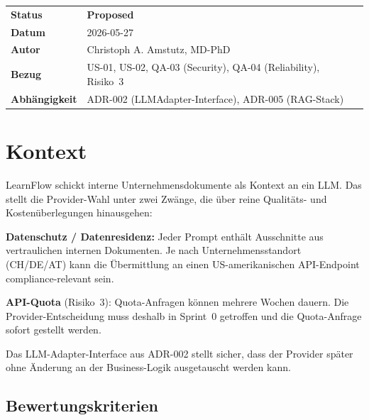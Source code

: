 \documentclass[a4paper, 11pt, oneside]{report}
\newcommand{\statusProposed}{%
  \colorbox{statusproposed!28}{\small\bfseries\color{statusproposed!70!black}\;Proposed\;}}
\begin{document}
\begin{tcolorbox}[enhanced, colback=adrlightblue, colframe=adrblue,
  boxrule=0.9pt, arc=3pt, left=8pt, right=8pt, top=6pt, bottom=6pt]
\begin{tabular}{@{}L{3.2cm}L{11.5cm}@{}}
\textbf{Status}      & \statusProposed \\[3pt]
\textbf{Datum}       & 2026-05-27 \\[3pt]
\textbf{Autor}       & Christoph A. Amstutz, MD-PhD \\[3pt]
\textbf{Bezug}       & US-01, US-02, QA-03 (Security), QA-04 (Reliability), Risiko~3 \\[3pt]
\textbf{Abhängigkeit}& ADR-002 (LLMAdapter-Interface), ADR-005 (RAG-Stack) \\
\end{tabular}
\end{tcolorbox}

\section{Kontext}

LearnFlow schickt interne Unternehmensdokumente als Kontext an ein LLM.
Das stellt die Provider-Wahl unter zwei Zwänge, die über reine
Qualitäts- und Kostenüberlegungen hinausgehen:

\textbf{Datenschutz / Datenresidenz:} Jeder Prompt enthält Ausschnitte aus
vertraulichen internen Dokumenten. Je nach Unternehmensstandort (CH/DE/AT)
kann die Übermittlung an einen US-amerikanischen API-Endpoint
compliance-relevant sein.

\textbf{API-Quota} (Risiko~3): Quota-Anfragen können mehrere Wochen dauern.
Die Provider-Entscheidung muss deshalb in Sprint~0 getroffen und die
Quota-Anfrage sofort gestellt werden.

Das LLM-Adapter-Interface aus ADR-002 stellt sicher, dass der Provider
später ohne Änderung an der Business-Logik ausgetauscht werden kann.

\subsection{Bewertungskriterien}
\end{document}
